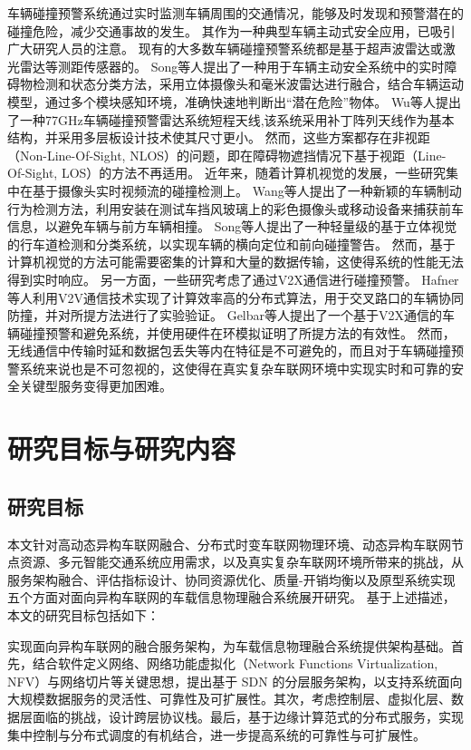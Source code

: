 车辆碰撞预警系统通过实时监测车辆周围的交通情况，能够及时发现和预警潜在的碰撞危险，减少交通事故的发生。
其作为一种典型车辆主动式安全应用，已吸引广大研究人员的注意。
现有的大多数车辆碰撞预警系统都是基于超声波雷达或激光雷达等测距传感器的。
Song等人\cite{song2018real}提出了一种用于车辆主动安全系统中的实时障碍物检测和状态分类方法，采用立体摄像头和毫米波雷达进行融合，结合车辆运动模型，通过多个模块感知环境，准确快速地判断出“潜在危险”物体。
Wu等人\cite{wu2019series}提出了一种77GHz车辆碰撞预警雷达系统短程天线,该系统采用补丁阵列天线作为基本结构，并采用多层板设计技术使其尺寸更小。
然而，这些方案都存在非视距（Non-Line-Of-Sight, NLOS）的问题，即在障碍物遮挡情况下基于视距（Line-Of-Sight, LOS）的方法不再适用。
近年来，随着计算机视觉的发展，一些研究集中在基于摄像头实时视频流的碰撞检测上。
Wang等人\cite{wang2016vision}提出了一种新颖的车辆制动行为检测方法，利用安装在测试车挡风玻璃上的彩色摄像头或移动设备来捕获前车信息，以避免车辆与前方车辆相撞。
Song等人\cite{song2018lane}提出了一种轻量级的基于立体视觉的行车道检测和分类系统，以实现车辆的横向定位和前向碰撞警告。
然而，基于计算机视觉的方法可能需要密集的计算和大量的数据传输，这使得系统的性能无法得到实时响应。 
另一方面，一些研究考虑了通过V2X通信进行碰撞预警。
Hafner等人\cite{hafner2013cooperative}利用V2V通信技术实现了计算效率高的分布式算法，用于交叉路口的车辆协同防撞，并对所提方法进行了实验验证。
Gelbar等人\cite{gelbal2017elastic}提出了一个基于V2X通信的车辆碰撞预警和避免系统，并使用硬件在环模拟证明了所提方法的有效性。
然而，无线通信中传输时延和数据包丢失等内在特征是不可避免的，而且对于车辆碰撞预警系统来说也是不可忽视的，这使得在真实复杂车联网环境中实现实时和可靠的安全关键型服务变得更加困难。

\section{研究目标与研究内容}\label{section 1-4}
\subsection{研究目标}

本文针对高动态异构车联网融合、分布式时变车联网物理环境、动态异构车联网节点资源、多元智能交通系统应用需求，以及真实复杂车联网环境所带来的挑战，从服务架构融合、评估指标设计、协同资源优化、质量-开销均衡以及原型系统实现五个方面对面向异构车联网的车载信息物理融合系统展开研究。
基于上述描述，本文的研究目标包括如下：

 实现面向异构车联网的融合服务架构，为车载信息物理融合系统提供架构基础。首先，结合软件定义网络、网络功能虚拟化（Network Functions Virtualization, NFV）与网络切片等关键思想，提出基于 SDN 的分层服务架构，以支持系统面向大规模数据服务的灵活性、可靠性及可扩展性。其次，考虑控制层、虚拟化层、数据层面临的挑战，设计跨层协议栈。最后，基于边缘计算范式的分布式服务，实现集中控制与分布式调度的有机结合，进一步提高系统的可靠性与可扩展性。

